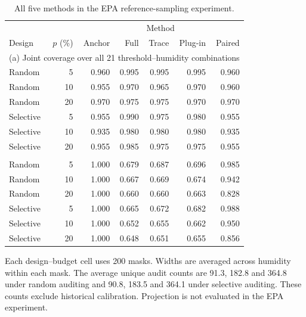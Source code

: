 \begin{table}[p]\centering{}
\caption{All five methods in the EPA reference-sampling experiment.}\label{tab:epa_budget}
\setlength{\tabcolsep}{4pt}
\begin{tabular}{lrrrrrr}\toprule
 & & \multicolumn{5}{c}{Method}\\
Design & $p$ (\%) & Anchor & Full & Trace & Plug-in & Paired \\\midrule
\multicolumn{7}{l}{(a) Joint coverage over all 21 threshold--humidity combinations}\\
Random & 5 & 0.960 & 0.995 & 0.995 & 0.995 & 0.960 \\
Random & 10 & 0.955 & 0.970 & 0.965 & 0.970 & 0.960 \\
Random & 20 & 0.970 & 0.975 & 0.975 & 0.970 & 0.970 \\
Selective & 5 & 0.955 & 0.990 & 0.975 & 0.980 & 0.955 \\
Selective & 10 & 0.935 & 0.980 & 0.980 & 0.980 & 0.935 \\
Selective & 20 & 0.955 & 0.985 & 0.975 & 0.975 & 0.955 \\
\addlinespace[4pt]
\multicolumn{7}{l}{(b) Mean within-mask width ratio to Anchor}\\
Random & 5 & 1.000 & 0.679 & 0.687 & 0.696 & 0.985 \\
Random & 10 & 1.000 & 0.667 & 0.669 & 0.674 & 0.942 \\
Random & 20 & 1.000 & 0.660 & 0.660 & 0.663 & 0.828 \\
Selective & 5 & 1.000 & 0.665 & 0.672 & 0.682 & 0.988 \\
Selective & 10 & 1.000 & 0.652 & 0.655 & 0.662 & 0.950 \\
Selective & 20 & 1.000 & 0.648 & 0.651 & 0.655 & 0.856 \\
\bottomrule\end{tabular}
\par\raggedright\noindent Each design--budget cell uses 200 masks. Widths are averaged across humidity within each mask. The average unique audit counts are 91.3, 182.8 and 364.8 under random auditing and 90.8, 183.5 and 364.1 under selective auditing. These counts exclude historical calibration. Projection is not evaluated in the EPA experiment.
\end{table}
